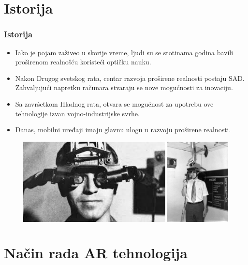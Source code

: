 \documentclass[9pt]{beamer}
\begin{document}
\section{Istorija}
	\begin{frame}
    \frametitle{Istorija}
        \begin{itemize}
            \setlength\itemsep{1.3em}
            \item Iako je pojam zaživeo u skorije vreme, ljudi su se stotinama godina bavili proširenom realnošću koristeći optičku nauku.
            \item Nakon Drugog svetskog rata, centar razvoja proširene realnosti postaju SAD. Zahvaljujući napretku računara stvaraju se nove mogućnosti za inovaciju.
            \item Sa završetkom Hladnog rata, otvara se mogućnost za upotrebu ove tehnologije izvan vojno-industrijske svrhe.
            \item Danas, mobilni uređaji imaju glavnu ulogu u razvoju proširene realnosti.
		\end{itemize}
	 \begin{figure}[h!]
		\begin{center}
		\includegraphics[scale=0.4]{raniprototip_harvard.png}
		\end{center}
            \end{figure}
	\end{frame}
	
\section{Način rada AR tehnologija}
\end{document}
